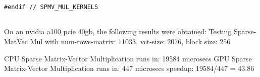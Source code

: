 \documentclass{article}
\begin{document}
\begin{itemize}
\begin{lstlisting}[language=cuda, basicstyle=\footnotesize]
    #endif // SPMV_MUL_KERNELS


  \end{lstlisting}

  On an nvidia a100 pcie 40gb, the following results were obtained:
  Testing Sparse-MatVec Mul with num-rows-matrix: 11033, vct-size: 2076, block size: 256

  CPU Sparse Matrix-Vector Multiplication runs in: 19584 microsecs
  GPU Sparse Matrix-Vector Multiplication runs in: 447 microsecs
  speedup: 19584/447 = 43.86
\end{itemize}
\end{document}
